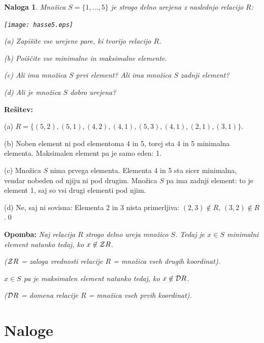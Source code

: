 \documentclass[11pt,paper=b5,footinclude,headinclude]{scrbook} %
\newtheorem*{problem}{Naloga}
\begin{document}
\begin{problem}
Množica $S=\{1,\ldots,5\}$ je strogo delno urejena z naslednjo relacijo $R$:
\begin{center}
\texttt{[image: hasse5.eps]}
\end{center}

(a) Zapišite vse urejene pare, ki tvorijo relacijo $R$.

(b) Poiščite vse minimalne in maksimalne elemente.

(c) Ali ima množica $S$ prvi element? Ali ima množica $S$ zadnji element?

(d) Ali je množica $S$ dobro urejena?
\end{problem}

\textbf{Rešitev:}

(a) $R = \{(5,2),(5,1),(4,2),(4,1),(5,3),(4,1),(2,1),(3,1)\}$.

(b) Noben element ni pod elementoma 4 in 5, torej sta 4 in 5 minimalna elementa.
Maksimalen element pa je samo eden: 1.

(c) Množica $S$ nima prvega elementa. Elementa 4 in 5 sta sicer minimalna, vendar nobeden
od njiju ni pod drugim. Množica $S$ pa ima zadnji element: to je element 1, saj so vsi drugi elementi
pod njim.

(d) Ne, saj ni sovisna: Elementa 2 in 3 nista primerljiva: $(2,3)\not\in R$, $(3,2)\not\in R$.\qed

\bigskip
\textbf{Opomba:} \emph{Naj relacija $R$ strogo delno ureja množico $S$.
Tedaj je $x\in S$ minimalni element natanko tedaj, ko $x\not\in {\cal Z}R$.}

\emph{(${\cal Z}R$ = zaloga vrednosti relacije $R$ = množica vseh drugih koordinat).}

\emph{$x\in S$ pa je maksimalen element natanko tedaj, ko $x\not\in {\cal D}R$.}

\emph{(${\cal D}R$ = domena relacije $R$ = množica vseh prvih koordinat).}

\section{Naloge}
\end{document}

